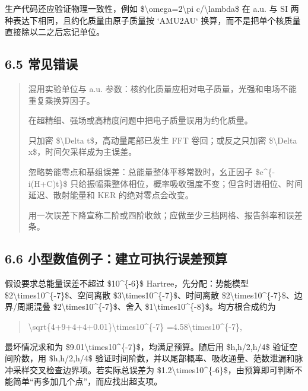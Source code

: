 \documentclass[UTF8,openany,11pt,fontset=fandol]{ctexbook}
\begin{document}
生产代码还应验证物理一致性，例如
\$\textbackslash omega=2\textbackslash pi c/\textbackslash lambda\$ 在
a.u. 与 SI 两种表达下相同，且约化质量由原子质量按 `AMU2AU`
换算，而不是把单个核质量直接除以二之后忘记单位。

\subsection{\texorpdfstring{\textbf{6.5
常见错误}}{6.5 常见错误}}\label{ux5e38ux89c1ux9519ux8bef-5}

\begin{quote}
混用实验单位与 a.u.
参数：核约化质量应相对电子质量，光强和电场不能重复乘换算因子。

在超精细、强场或高精度问题中把电子质量误用为约化质量。

只加密 \$\textbackslash Delta t\$，高动量尾部已发生 FFT
卷回；或反之只加密 \$\textbackslash Delta x\$，时间欠采样成为主误差。

忽略势能零点和基组误差：总能量整体平移常数时，幺正因子
\$e\^{}\{-i(H+C)t\}\$
只给振幅乘整体相位，概率吸收强度不变；但含时谱相位、时间延迟、散射能量和
KER 的绝对零点会改变。

用一次误差下降宣称二阶或四阶收敛；应做至少三档网格、报告斜率和误差条。
\end{quote}

\subsection{\texorpdfstring{\textbf{6.6
小型数值例子：建立可执行误差预算}}{6.6 小型数值例子：建立可执行误差预算}}\label{ux5c0fux578bux6570ux503cux4f8bux5b50ux5efaux7acbux53efux6267ux884cux8befux5deeux9884ux7b97}

假设要求总能量误差不超过 \$10\^{}\{-6\}\$ Hartree，先分配：势能模型
\$2\textbackslash times10\^{}\{-7\}\$、空间离散
\$3\textbackslash times10\^{}\{-7\}\$、时间离散
\$2\textbackslash times10\^{}\{-7\}\$、边界/周期混叠
\$2\textbackslash times10\^{}\{-7\}\$、舍入
\$1\textbackslash times10\^{}\{-8\}\$。均方根合成约为

\begin{quote}
\textbackslash sqrt\{4+9+4+4+0.01\}\textbackslash times10\^{}\{-7\}
=4.58\textbackslash times10\^{}\{-7\},
\end{quote}

最坏情况求和为
\$9.01\textbackslash times10\^{}\{-7\}\$，均满足预算。随后用
\$h,h/2,h/4\$ 验证空间阶数，用 \$h,h/2,h/4\$
验证时间阶数，并以尾部概率、吸收通量、范数泄漏和脉冲采样交叉检查边界项。若实际总误差为
\$1.2\textbackslash times10\^{}\{-6\}\$，由预算即可判断不能简单``再多加几个点''，而应找出超支项。
\end{document}
